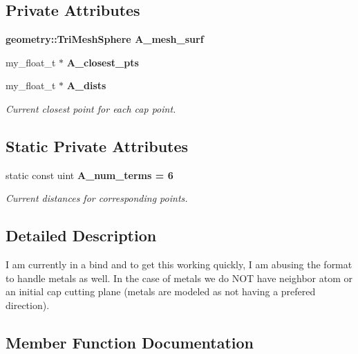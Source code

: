 \subsection*{Private Attributes}
\begin{CompactItemize}
\item 
\bf{geometry::Tri\-Mesh\-Sphere} \textbf{A\_\-mesh\_\-surf}\label{classSimSite3D_1_1model__hbond__surf__t_64c41345670808e5f52e8b01661330e3}

\item 
my\_\-float\_\-t $\ast$ \textbf{A\_\-closest\_\-pts}\label{classSimSite3D_1_1model__hbond__surf__t_9146d87c587720dc5f4b1a26061e68e7}

\item 
my\_\-float\_\-t $\ast$ \bf{A\_\-dists}\label{classSimSite3D_1_1model__hbond__surf__t_fe16dd162d555d9c018561573a463aaf}

\begin{CompactList}\small\item\em Current closest point for each cap point. \item\end{CompactList}\end{CompactItemize}
\subsection*{Static Private Attributes}
\begin{CompactItemize}
\item 
static const uint \bf{A\_\-num\_\-terms} = 6\label{classSimSite3D_1_1model__hbond__surf__t_7e554d42744ddf3ab7903a73937e3aeb}

\begin{CompactList}\small\item\em Current distances for corresponding points. \item\end{CompactList}\end{CompactItemize}


\subsection{Detailed Description}
I am currently in a bind and to get this working quickly, I am abusing the format to handle metals as well. In the case of metals we do NOT have neighbor atom or an initial cap cutting plane (metals are modeled as not having a prefered direction). 



\subsection{Member Function Documentation}
